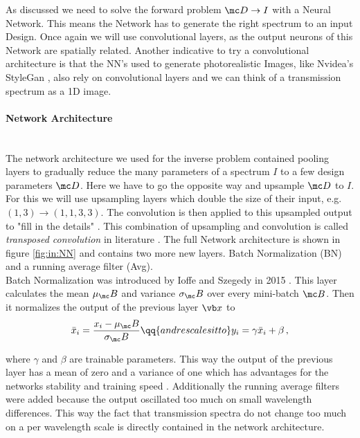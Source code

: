 As discussed we need to solve the forward problem $\mc D \rightarrow I$ with a Neural Network. This means the Network has to generate the right spectrum to an input Design. Once again we will use convolutional layers, as the output neurons of this Network are spatially related. Another indicative to try a convolutional architecture is that the NN's used to generate photorealistic Images, like Nvidea's StyleGan \cite{Karras2018}, also rely on convolutional layers and we can think of a transmission spectrum as a 1D image.


\paragraph{Network Architecture}~\\
The network architecture we used for the inverse problem contained pooling layers to gradually reduce the many parameters of a spectrum $I$ to a few design parameters $\mc D$. Here we have to go the opposite way and upsample $\mc D$ to $I$. For this we will use upsampling layers which double the size of their input, e.g. $(1,3) \rightarrow (1,1,3,3)$. The convolution is then applied to this upsampled output to "fill in the details" . This combination of upsampling and convolution is called \textit{transposed convolution} in literature . The full Network architecture is shown in figure \ref{fig:in:NN} and contains two more new layers. Batch Normalization (BN) and a running average filter (Avg).
\\

\indent
Batch Normalization was introduced by Ioffe and Szegedy in 2015 \cite{Ioffe2015}. This layer calculates the mean $\mu_\mc B$ and variance $\sigma_\mc B$ over every mini-batch $\mc B$. Then it normalizes the output of the previous layer $\vb x$ to 
\begin{equation}
    \bar x_i = \frac{x_i - \mu_\mc B}{\sigma_\mc B}
    \qq{and rescales it to}
    y_i = \gamma \bar x_i + \beta \,,
\end{equation}

where $\gamma$ and $\beta$ are trainable parameters. This way the output of the previous layer has a mean of zero and a variance of one which has advantages for the networks stability and training speed .
Additionally the running average filters were added because the output oscillated too much on small wavelength differences. This way the fact that transmission spectra do not change too much on a per wavelength scale is directly contained in the network architecture. 
\\

